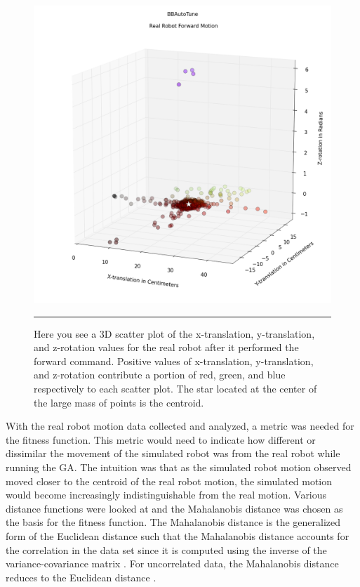\begin{figure}[htbp]
\centering
\includegraphics[scale=0.5]{../Figures/Chapter4/real_robot_3d_scatter.png}
\rule{35em}{0.5pt}
\caption[Real Robot Forward Motion 3D Scatter Plot]{Here you see a 3D scatter plot of the x-translation, y-translation, and z-rotation values for the real robot after it performed the forward command. Positive values of x-translation, y-translation, and z-rotation contribute a portion of red, green, and blue respectively to each scatter plot. The star located at the center of the large mass of points is the centroid.}
\label{fig:real_robot_3d_scatter}
\end{figure}

With the real robot motion data collected and analyzed, a metric was needed for the fitness function. This metric would need to indicate how different or dissimilar the movement of the simulated robot was from the real robot while running the GA. The intuition was that as the simulated robot motion observed moved closer to the centroid of the real robot motion, the simulated motion would become increasingly indistinguishable from the real motion. Various distance functions were looked at and the Mahalanobis distance was chosen as the basis for the fitness function. The Mahalanobis distance is the generalized form of the Euclidean distance such that the Mahalanobis distance accounts for the correlation in the data set since it is computed using the inverse of the variance-covariance matrix \cite{mahalanobis_distance}. For uncorrelated data, the Mahalanobis distance reduces to the Euclidean distance \cite{what_is_mahalanobis_distance}.

